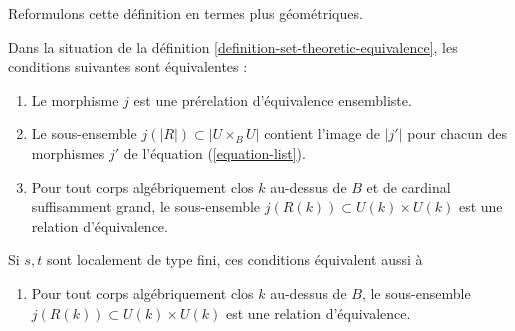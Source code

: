 \noindent
Reformulons cette définition en termes plus géométriques.

\begin{lemma}
\label{lemma-set-theoretic-pre-equivalence-geometric}
Dans la situation de la définition \ref{definition-set-theoretic-equivalence},
les conditions suivantes sont équivalentes :
\begin{enumerate}
\item Le morphisme $j$ est une prérelation d'équivalence ensembliste.
\item Le sous-ensemble $j(|R|) \subset |U \times_B U|$ contient l'image de
$|j'|$ pour chacun des morphismes $j'$ de l'équation (\ref{equation-list}).
\item Pour tout corps algébriquement clos $k$ au-dessus de $B$ et de cardinal suffisamment grand,
le sous-ensemble $j(R(k)) \subset U(k) \times U(k)$ est une relation
d'équivalence.
\end{enumerate}
Si $s, t$ sont localement de type fini, ces conditions équivalent aussi à
\begin{enumerate}
\item[(4)] Pour tout corps algébriquement clos $k$ au-dessus de $B$,
le sous-ensemble $j(R(k)) \subset U(k) \times U(k)$ est une relation d'équivalence.
\end{enumerate}
\end{lemma}

